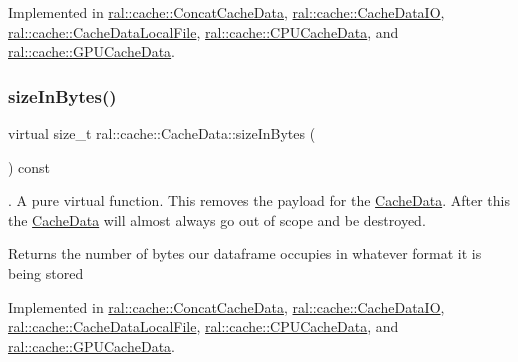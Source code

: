 Implemented in \hyperlink{classral_1_1cache_1_1ConcatCacheData_a02f400f33f88ba3e216f5899fa4f12b8}{ral\+::cache\+::\+Concat\+Cache\+Data}, \hyperlink{classral_1_1cache_1_1CacheDataIO_a9f5ae6134a546813c74a2924f7567080}{ral\+::cache\+::\+Cache\+Data\+IO}, \hyperlink{classral_1_1cache_1_1CacheDataLocalFile_a49c8d137ef2d0a30ee59025f91725567}{ral\+::cache\+::\+Cache\+Data\+Local\+File}, \hyperlink{classral_1_1cache_1_1CPUCacheData_a3d0444ff9ba0814775499060071a2d1a}{ral\+::cache\+::\+C\+P\+U\+Cache\+Data}, and \hyperlink{classral_1_1cache_1_1GPUCacheData_a35d56396384cd4380141d47291d3e55f}{ral\+::cache\+::\+G\+P\+U\+Cache\+Data}.

\mbox{\label{classral_1_1cache_1_1CacheData_aaad8a726296574845f01f9380dcee40d}} 
\subsubsection{\texorpdfstring{size\+In\+Bytes()}{sizeInBytes()}}
{\footnotesize\ttfamily virtual size\+\_\+t ral\+::cache\+::\+Cache\+Data\+::size\+In\+Bytes (\begin{DoxyParamCaption}{ }\end{DoxyParamCaption}) const\hspace{0.3cm}{\ttfamily [pure virtual]}}

. A pure virtual function. This removes the payload for the \hyperlink{classral_1_1cache_1_1CacheData}{Cache\+Data}. After this the \hyperlink{classral_1_1cache_1_1CacheData}{Cache\+Data} will almost always go out of scope and be destroyed. \begin{DoxyReturn}{Returns}
the number of bytes our dataframe occupies in whatever format it is being stored 
\end{DoxyReturn}


Implemented in \hyperlink{classral_1_1cache_1_1ConcatCacheData_a25914d06c36e4a1748dc9479adc5ccd8}{ral\+::cache\+::\+Concat\+Cache\+Data}, \hyperlink{classral_1_1cache_1_1CacheDataIO_a3364dc1069ceba37e2ffc97e5a4508aa}{ral\+::cache\+::\+Cache\+Data\+IO}, \hyperlink{classral_1_1cache_1_1CacheDataLocalFile_ab0853eca16df1149f4ac0efbf3faa556}{ral\+::cache\+::\+Cache\+Data\+Local\+File}, \hyperlink{classral_1_1cache_1_1CPUCacheData_a83236d09b1d2341059d1a6738839d35c}{ral\+::cache\+::\+C\+P\+U\+Cache\+Data}, and \hyperlink{classral_1_1cache_1_1GPUCacheData_a4fc8aecb334114f0ef07ce37be0e8900}{ral\+::cache\+::\+G\+P\+U\+Cache\+Data}.

